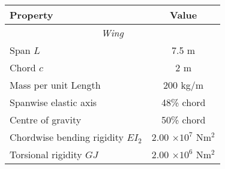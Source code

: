 \documentclass{standalone}
\begin{document}
    \centering
    \begin{tabular}{l c}
    \toprule
    \toprule
    Property&Value\\
    \midrule
    \multicolumn{2}{c}{\textit{Wing}}\\
    Span $L$     & 7.5 m  \\
    Chord $c$   & 2 m \\
    Mass per unit Length     & 200 kg/m\\
    Spanwise elastic axis   & 48\% chord\\
    Centre of gravity   & 50\% chord\\
    Chordwise bending rigidity $EI_2$   & 2.00 $\times 10^7$ Nm$^2$\\
    Torsional rigidity $GJ$ & 2.00 $\times 10^6$ Nm$^2$\\
    \bottomrule
    \bottomrule
    \end{tabular}
    
\end{document}
